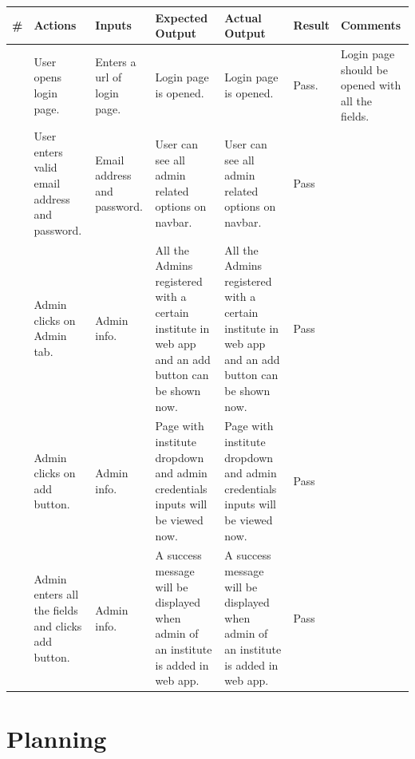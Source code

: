 \documentclass[12pt]{article}
\begin{document}
\begin{longtable}{ |>{\raggedright\arraybackslash} p{0.7cm} | >{\raggedright\arraybackslash}p{2cm}|>{\raggedright\arraybackslash} p{2cm} |>{\raggedright\arraybackslash} p{2.5cm} |>{\raggedright\arraybackslash} p{2.5cm} |>{\raggedright\arraybackslash} p{1.3cm} |>{\raggedright\arraybackslash} p{2.5cm} | } 
\hline
\textbf{\#}
& \textbf{Actions} 
& \textbf{Inputs}
& \textbf{Expected Output} 
& \textbf{Actual Output} 
& \textbf{Result} 
& \textbf{Comments} 
\\ 
\hline
1
& User opens login page. 
& Enters a url of login page.
& Login page is opened.
& Login page is opened.
& Pass.
& Login page should be opened with all the fields.
\\ 
\hline
2 
& User enters valid email address and password.
& Email address and password.
& User can see all admin related options on navbar.
& User can see all admin related options on navbar. 
& Pass
&  
\\ 
\hline
3
& Admin clicks on Admin tab.
& Admin info.
& All the Admins registered with a certain institute in web app and an add button can be shown now.
& All the Admins registered with a certain institute in web app and an add button can be shown now. 
& Pass
&  
\\ 
\hline
4
& Admin clicks on add button.
& Admin info.
& Page with institute dropdown and admin credentials inputs will be viewed now.
& Page with institute dropdown and admin credentials inputs will be viewed now. 
& Pass
&  
\\ 
\hline
5
& Admin enters all the fields and clicks add button.
& Admin info.
& A success message will be displayed when admin of an institute is added in web app.
& A success message will be displayed when admin of an institute is added in web app. 
& Pass
&  
\\ 
\hline
\end{longtable}



\newpage

\section{Planning}
\end{document}
